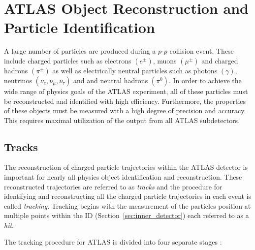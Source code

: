 \graphicspath{{Ch3_Reconstruction/figures/}}

\chapter{ATLAS Object Reconstruction and Particle Identification}

A large number of particles are produced during a $p$-$p$ collision event.
These include charged particles such as electrons $(e^\pm)$, muons $(\mu^\pm)$ and charged hadrons $(\pi^\pm)$ as well as electrically neutral particles such as photons $(\gamma)$, neutrinos $(\nu_e, \nu_\mu, \nu_\tau)$ and and neutral hadrons $(\pi^0)$.
In order to achieve the wide range of physics goals of the ATLAS experiment, all of these particles must be reconstructed and identified with high efficiency.
Furthermore, the properties of these objects must be measured with a high degree of precision and accuracy.
This requires maximal utilization of the output from all ATLAS subdetectors.


\section{Tracks}
\label{sec:tracking}
The reconstruction of charged particle trajectories within the ATLAS detector is important for nearly all physics object identification and reconstruction.
These reconstructed trajectories are referred to as \textit{tracks} and the procedure for identifying and reconstructing all the charged particle trajectories in each event is called \textit{tracking}.
Tracking begins with the measurement of the particles position at multiple points within the ID (Section~\ref{sec:inner_detector}) each referred to as a \textit{hit}.

The tracking procedure for ATLAS is divided into four separate stages \cite{Salzburger:2015sgq}:

